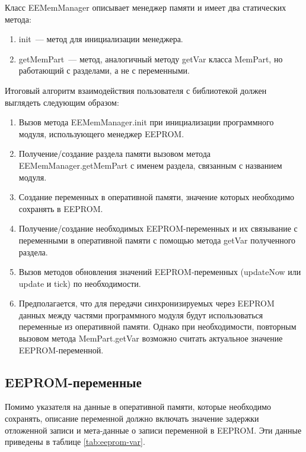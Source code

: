 Класс EEMemManager описывает менеджер памяти и имеет два статических метода:
\begin{enumerate}
	\item init~--- метод для инициализации менеджера.
	\item getMemPart~--- метод, аналогичный методу getVar класса MemPart, но работающий с разделами, а не с переменными.
\end{enumerate}


Итоговый алгоритм взаимодействия пользователя с библиотекой должен выглядеть следующим образом:
\begin{enumerate}
	\item Вызов метода EEMemManager.init при инициализации программного модуля, использующего менеджер EEPROM.
	\item Получение/создание раздела памяти вызовом метода EEMemManager.getMemPart с именем раздела, связанным с названием модуля.
	\item Создание переменных в оперативной памяти, значение которых необходимо сохранять в EEPROM.
	\item Получение/создание необходимых EEPROM-переменных и их связывание с переменными в оперативной памяти с помощью метода getVar полученного раздела.
	\item Вызов методов обновления значений EEPROM-переменных (updateNow или update и tick) по необходимости.
	\item Предполагается, что для передачи синхронизируемых через EEPROM данных между частями программного модуля будут использоваться переменные из оперативной памяти. Однако при необходимости, повторным вызовом метода MemPart.getVar возможно считать актуальное значение EEPROM-переменной.
\end{enumerate}


\subsection{EEPROM-переменные}

Помимо указателя на данные в оперативной памяти, которые необходимо сохранять, описание переменной должно включать значение задержки отложенной записи и мета-данные о записи переменной в EEPROM.
Эти данные приведены в таблице \ref{tab:eeprom-var}.

